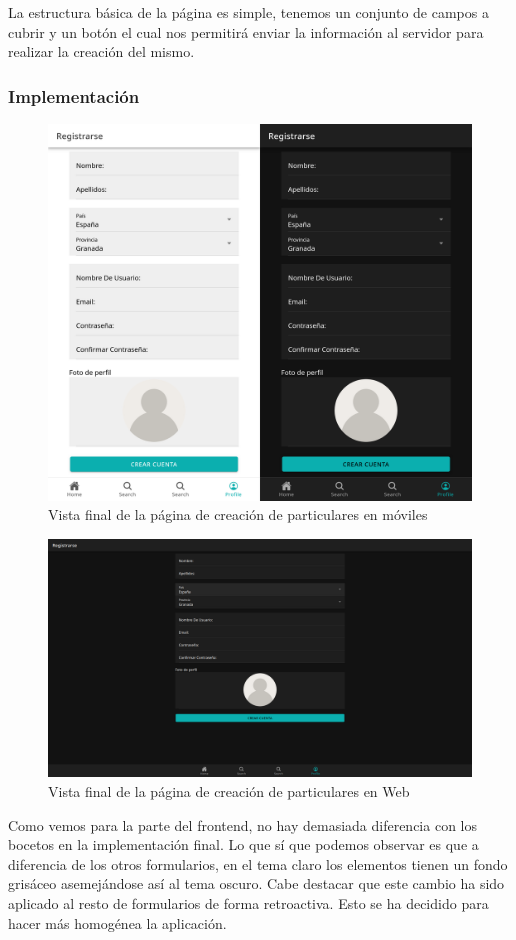 La estructura básica de la página es simple, tenemos un conjunto de campos a cubrir y un botón el cual nos permitirá enviar la información al servidor para realizar la creación del mismo. \\

\subsubsection{Implementación}

\begin{figure}[H]
	\centering
	\includegraphics[width=0.7\linewidth]{"sprint 2/hu5/impRegistroParticulares"}
	\caption{Vista final de la página de creación de particulares en móviles}
	\label{fig:impregistroparticulares}
\end{figure}

\begin{figure}[H]
	\centering
	\includegraphics[width=0.7\linewidth]{"sprint 2/hu5/impRegistroParticularesWeb"}
	\caption{Vista final de la página de creación de particulares en Web}
	\label{fig:impregistroparticularesweb}
\end{figure}


Como vemos para la parte del frontend, no hay demasiada diferencia con los bocetos en la implementación final. Lo que sí que podemos observar es que a diferencia de los otros formularios, en el tema claro los elementos tienen un fondo grisáceo asemejándose así al tema oscuro. Cabe destacar que este cambio ha sido aplicado al resto de formularios de forma retroactiva. Esto se ha decidido para hacer más homogénea la aplicación.


